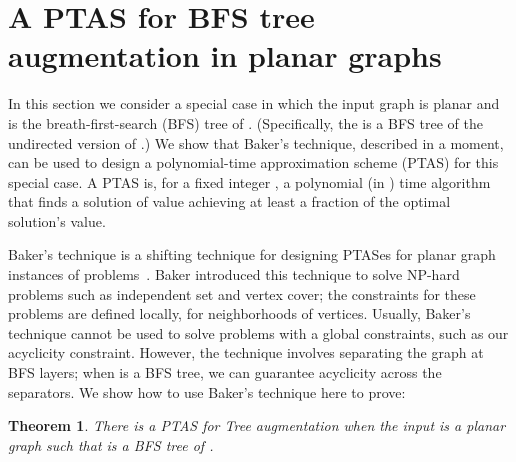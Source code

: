 \documentclass{article}
\newtheorem{theorem}{Theorem}
\begin{document}
\section{A PTAS for {\sc BFS tree augmentation} in planar graphs}
\label{sec:planar}

In this section we consider a special case in which the input graph
 is planar and  is the breath-first-search
(BFS) tree of . (Specifically, the  is a BFS tree of the
undirected version of .)  We show that Baker's technique, described in a moment,
can be used to design a polynomial-time approximation scheme (PTAS)
for this special case.  A PTAS is, for a fixed
integer , a polynomial (in ) time algorithm that finds a
solution of value achieving at least a  fraction of
the optimal solution's value.  


Baker's technique is a shifting technique for designing PTASes for
planar graph instances of problems~\cite{Baker1994}.  Baker introduced
this technique to solve NP-hard problems such as {\sc independent set}
and {\sc vertex cover}; the constraints for these problems are defined
locally, for neighborhoods of vertices.  Usually, Baker's technique
cannot be used to solve problems with a global constraints, such as
our acyclicity constraint.  However, the technique involves separating
the graph at BFS layers; when  is a BFS tree, we can guarantee
acyclicity across the separators.  We show how to use Baker's
technique here to prove:

\begin{theorem}\label{thm:planar} There is a PTAS for {\sc Tree augmentation} when the input is a planar graph  such that  is a BFS tree of .
\end{theorem}
\end{document}
